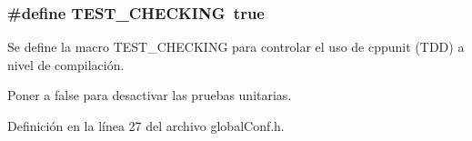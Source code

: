 \subsubsection[{T\+E\+S\+T\+\_\+\+C\+H\+E\+C\+K\+I\+N\+G}]{\setlength{\rightskip}{0pt plus 5cm}\#define T\+E\+S\+T\+\_\+\+C\+H\+E\+C\+K\+I\+N\+G~true}\label{global_conf_8h_a1adf200feffe9d395e8cf3acd3d029d8}
Se define la macro T\+E\+S\+T\+\_\+\+C\+H\+E\+C\+K\+I\+N\+G para controlar el uso de cppunit (T\+D\+D) a nivel de compilación.

Poner a false para desactivar las pruebas unitarias. 

Definición en la línea 27 del archivo global\+Conf.\+h.

